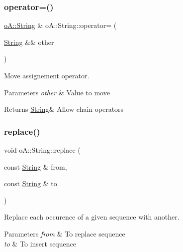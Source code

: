 \subsubsection{\texorpdfstring{operator=()}{operator=()}\hspace{0.1cm}{\footnotesize\ttfamily [2/2]}}
{\footnotesize\ttfamily \mbox{\hyperlink{classo_a_1_1_string}{o\+A\+::\+String}} \& o\+A\+::\+String\+::operator= (\begin{DoxyParamCaption}\item[{\mbox{\hyperlink{classo_a_1_1_string}{String}} \&\&}]{other }\end{DoxyParamCaption})\hspace{0.3cm}{\ttfamily [noexcept]}}



Move assignement operator. 


\begin{DoxyParams}{Parameters}
{\em other} & Value to move \\
\hline
\end{DoxyParams}
\begin{DoxyReturn}{Returns}
\mbox{\hyperlink{classo_a_1_1_string}{String}}\& Allow chain operators 
\end{DoxyReturn}
\mbox{\label{classo_a_1_1_string_a54760c3b5fee78fbcc28a6d81dbfe6b3}} 
\subsubsection{\texorpdfstring{replace()}{replace()}}
{\footnotesize\ttfamily void o\+A\+::\+String\+::replace (\begin{DoxyParamCaption}\item[{const \mbox{\hyperlink{classo_a_1_1_string}{String}} \&}]{from,  }\item[{const \mbox{\hyperlink{classo_a_1_1_string}{String}} \&}]{to }\end{DoxyParamCaption})}



Replace each occurence of a given sequence with another. 


\begin{DoxyParams}{Parameters}
{\em from} & To replace sequence \\
\hline
{\em to} & To insert sequence \\
\hline
\end{DoxyParams}
\mbox{\label{classo_a_1_1_string_a9f974d8b83a0ae4232a33d249291f3c4}} 
